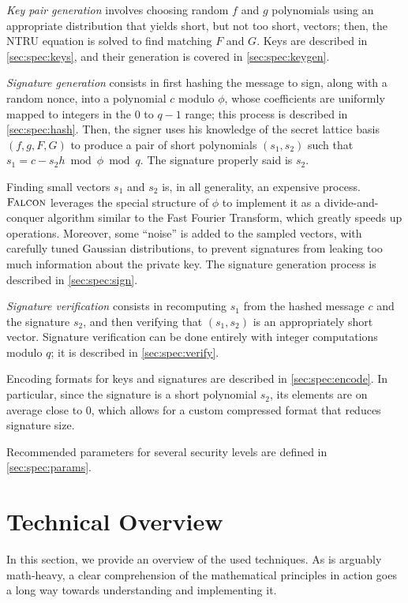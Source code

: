 \emph{Key pair generation} involves choosing random $f$ and $g$
polynomials using an appropriate distribution that yields short, but not
too short, vectors; then, the NTRU equation is solved to find matching
$F$ and $G$. Keys are described in \cref{sec:spec:keys}, and
their generation is covered in \cref{sec:spec:keygen}.

\emph{Signature generation} consists in first hashing the message to
sign, along with a random nonce, into a polynomial $c$ modulo $\phi$,
whose coefficients are uniformly mapped to integers in the $0$ to $q-1$
range; this process is described in \cref{sec:spec:hash}. Then,
the signer uses his knowledge of the secret lattice basis $(f,g,F,G)$ to
produce a pair of short polynomials $(s_1,s_2)$ such that $s_1 = c - s_2
h \bmod \phi \bmod q$. The signature properly said is $s_2$.

Finding small vectors $s_1$ and $s_2$ is, in all generality, an
expensive process. $\textsc{Falcon}$ leverages the special structure of $\phi$
to implement it as a divide-and-conquer algorithm similar to the Fast
Fourier Transform, which greatly speeds up operations. Moreover, some
``noise'' is added to the sampled vectors, with carefully tuned Gaussian
distributions, to prevent signatures from leaking too much information
about the private key. The signature generation process is described
in \cref{sec:spec:sign}.

\emph{Signature verification} consists in recomputing $s_1$ from the
hashed message $c$ and the signature $s_2$, and then verifying that
$(s_1,s_2)$ is an appropriately short vector. Signature verification can
be done entirely with integer computations modulo $q$; it is described
in \cref{sec:spec:verify}.

Encoding formats for keys and signatures are described in
\cref{sec:spec:encode}. In particular, since the signature is a
short polynomial $s_2$, its elements are on average close to $0$, which
allows for a custom compressed format that reduces signature size.

Recommended parameters for several security levels are defined in
\cref{sec:spec:params}.


\section{Technical Overview}\label{sec:spec:techoverview}


In this section, we provide an overview of the used techniques. As \falcon is arguably math-heavy, a clear comprehension of the mathematical principles in action goes a long way towards understanding and implementing it.

